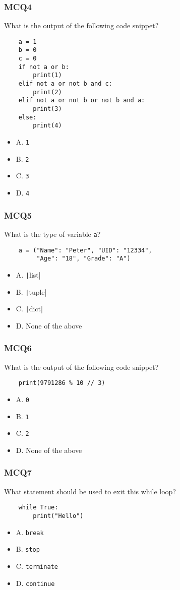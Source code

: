 \documentclass{beamer}
\newcommand{\python}[1]{\texttt|#1|}
\begin{document}
\begin{frame}[fragile]
    \frametitle{MCQ4}
    What is the output of the following code snippet?
    \begin{verbatim}
    a = 1
    b = 0
    c = 0
    if not a or b:
        print(1)
    elif not a or not b and c:
        print(2)
    elif not a or not b or not b and a:
        print(3)
    else:
        print(4)
    \end{verbatim}
    \begin{itemize}
        \item A. \texttt{1}
        \item B. \texttt{2}
        \item C. \texttt{3}
        \item D. \texttt{4}
    \end{itemize}
\end{frame}

\begin{frame}[fragile]
    \frametitle{MCQ5}
    What is the type of variable \texttt{a}?
    \begin{verbatim}
    a = ("Name": "Peter", "UID": "12334", 
         "Age": "18", "Grade": "A")
    \end{verbatim}
    \begin{itemize}
        \item A. \python{list}
        \item B. \python{tuple}
        \item C. \python{dict}
        \item D. None of the above
    \end{itemize}
\end{frame}

\begin{frame}[fragile]
    \frametitle{MCQ6}
    What is the output of the following code snippet?
    \begin{verbatim}
    print(9791286 % 10 // 3)
    \end{verbatim}
    \begin{itemize}
        \item A. \texttt{0}
        \item B. \texttt{1}
        \item C. \texttt{2}
        \item D. None of the above
    \end{itemize}
\end{frame}

\begin{frame}[fragile]
    \frametitle{MCQ7}
    What statement should be used to exit this while loop?
    \begin{verbatim}
    while True:
        print("Hello")
    \end{verbatim}
    \begin{itemize}
        \item A. \texttt{break}
        \item B. \texttt{stop}
        \item C. \texttt{terminate}
        \item D. \texttt{continue}
    \end{itemize}
\end{frame}
\end{document}

